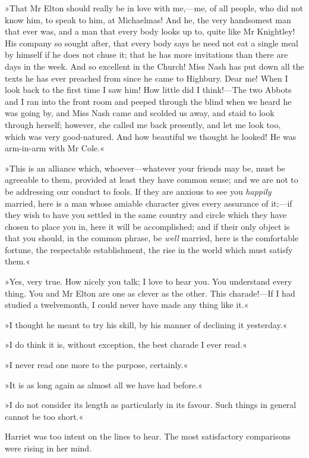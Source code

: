»That Mr Elton should really be in love with me,—me, of all people, who did not know him, to speak to him, at Michaelmas! And he, the very handsomest man that ever was, and a man that every body looks up to, quite like Mr Knightley! His company so sought after, that every body says he need not eat a single meal by himself if he does not chuse it; that he has more invitations than there are days in the week. And so excellent in the Church! Miss Nash has put down all the texts he has ever preached from since he came to Highbury. Dear me! When I look back to the first time I saw him! How little did I think!—The two Abbots and I ran into the front room and peeped through the blind when we heard he was going by, and Miss Nash came and scolded us away, and staid to look through herself; however, she called me back presently, and let me look too, which was very good-natured. And how beautiful we thought he looked! He was arm-in-arm with Mr Cole.«

»This is an alliance which, whoever—whatever your friends may be, must be agreeable to them, provided at least they have common sense; and we are not to be addressing our conduct to fools. If they are anxious to see you \textit{happily} married, here is a man whose amiable character gives every assurance of it;—if they wish to have you settled in the same country and circle which they have chosen to place you in, here it will be accomplished; and if their only object is that you should, in the common phrase, be \textit{well} married, here is the comfortable fortune, the respectable establishment, the rise in the world which must satisfy them.«

»Yes, very true. How nicely you talk; I love to hear you. You understand every thing. You and Mr Elton are one as clever as the other. This charade!—If I had studied a twelvemonth, I could never have made any thing like it.«

»I thought he meant to try his skill, by his manner of declining it yesterday.«

»I do think it is, without exception, the best charade I ever read.«

»I never read one more to the purpose, certainly.«

»It is as long again as almost all we have had before.«

»I do not consider its length as particularly in its favour. Such things in general cannot be too short.«

Harriet was too intent on the lines to hear. The most satisfactory comparisons were rising in her mind.

